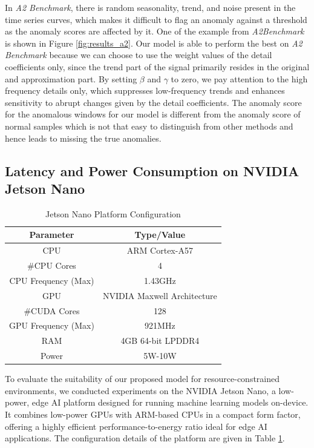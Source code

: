 In {\em A2 Benchmark}, there is random seasonality, trend, and noise present in the time series curves, which makes it difficult to flag an anomaly against a threshold as the anomaly scores are affected by it. One of the example from \emph{A2Benchmark} is shown in Figure \ref{fig:results_a2}. 
Our model is able to perform the best on {\em A2 Benchmark} because we can choose to use the weight values of the detail coefficients only, since the trend part of the signal primarily resides in the original and approximation part. By setting $\beta$ and $\gamma$ to zero, we pay attention to the high frequency details only, which suppresses low-frequency trends and enhances sensitivity to abrupt changes given by the detail coefficients. The anomaly score for the anomalous windows for our model is different from the anomaly score of normal samples which is not that easy to distinguish from other methods and hence leads to missing the true anomalies. 

\subsection{Latency and Power Consumption on NVIDIA Jetson Nano} 
\begin{table}[h!]
    \centering
    \caption{Jetson Nano Platform Configuration}
    \renewcommand{\arraystretch}{1.4} 
    \setlength{\tabcolsep}{9pt} 
    \begin{tabular}{c c}
    \hline
    \textbf{Parameter} & \textbf{Type/Value} \\
    \hline
    CPU & ARM Cortex-A57 \\
    $\#$CPU Cores & 4 \\
    CPU Frequency (Max) & 1.43GHz \\
    \hline
    GPU & NVIDIA Maxwell Architecture \\
    $\#$CUDA Cores & 128 \\
    GPU Frequency (Max) & 921MHz \\
    \hline
    RAM & 4GB 64-bit LPDDR4 \\
    \hline
    Power & 5W-10W \\
    \hline 
    \end{tabular}
    \label{tab:jetson}
\end{table}

To evaluate the suitability of our proposed model for resource-constrained environments, we conducted experiments on the NVIDIA Jetson Nano, a low-power, edge AI platform designed for running machine learning models on-device. It combines low-power GPUs with ARM-based CPUs in a compact form factor, offering a highly efficient performance-to-energy ratio ideal for edge AI applications. The configuration details of the platform are given in Table \ref{tab:jetson}.

